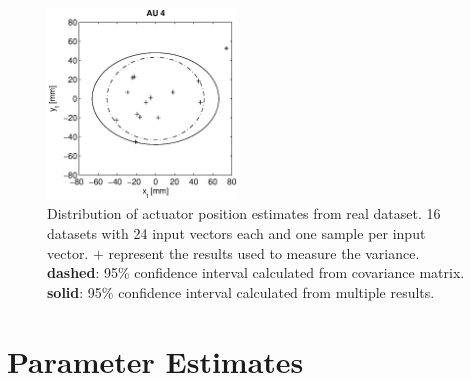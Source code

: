 \begin{figure}[hbtp]
\includegraphics[width = 0.45\textwidth]{images/results/real_confidence_95_interval_AU4.eps}
\caption{Distribution of actuator position estimates from real dataset. 16 datasets with 24 input vectors each and one sample per input vector.
$\mathbf{+}$ represent the results used to measure the variance.
\textbf{dashed}: 95\% confidence interval calculated from covariance matrix.
\textbf{solid}: 95\% confidence interval calculated from multiple results. }
\label{fig:result_95pc_real_confidence_all}
\end{figure}


\section{Parameter Estimates}
\label{sec:app_parameter_est}

